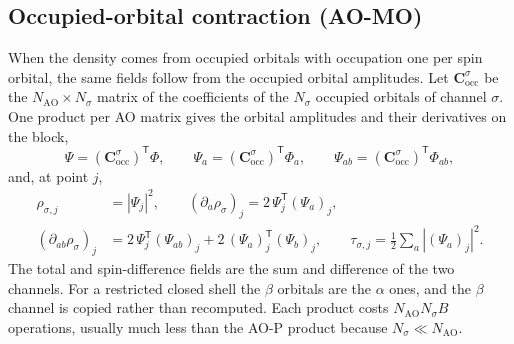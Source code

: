 \documentclass[11pt,a4paper]{article}
\begin{document}
\subsection{Occupied-orbital contraction (AO-MO)}
When the density comes from occupied orbitals with occupation one per spin
orbital, the same fields follow from the occupied orbital amplitudes. Let
$\mathbf C^\sigma_{\mathrm{occ}}$ be the $N_{\mathrm{AO}}\times N_\sigma$
matrix of the coefficients of the $N_\sigma$ occupied orbitals of channel
$\sigma$. One product per AO matrix gives the orbital amplitudes and their
derivatives on the block,
\begin{equation}
 \Psi=(\mathbf C^\sigma_{\mathrm{occ}})^{\mathsf T}\Phi,\qquad
 \Psi_a=(\mathbf C^\sigma_{\mathrm{occ}})^{\mathsf T}\Phi_a,\qquad
 \Psi_{ab}=(\mathbf C^\sigma_{\mathrm{occ}})^{\mathsf T}\Phi_{ab},
\end{equation}
and, at point $j$,
\begin{align}
 \rho_{\sigma,j}&=|\Psi_j|^2,\qquad
 (\partial_a\rho_\sigma)_j=2\,\Psi_j^{\mathsf T}(\Psi_a)_j,\\
 (\partial_{ab}\rho_\sigma)_j&=2\,\Psi_j^{\mathsf T}(\Psi_{ab})_j
   +2\,(\Psi_a)_j^{\mathsf T}(\Psi_b)_j,\qquad
 \tau_{\sigma,j}=\tfrac12\sum_a|(\Psi_a)_j|^2 .
\end{align}
The total and spin-difference fields are the sum and difference of the two
channels. For a restricted closed shell the $\beta$ orbitals are the
$\alpha$ ones, and the $\beta$ channel is copied rather than recomputed.
Each product costs $N_{\mathrm{AO}}N_\sigma B$ operations, usually much
less than the AO-P product because $N_\sigma\ll N_{\mathrm{AO}}$.
\end{document}
